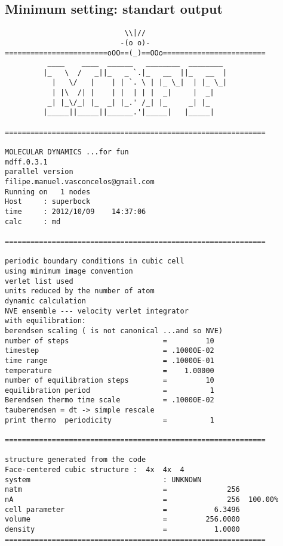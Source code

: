 \documentclass[a4paper]{article}
\begin{document}
\subsection{Minimum setting: standart output}
\begin{verbatim}
                            \\|//                    
                           -(o o)-                           
========================oOO==(_)==OOo========================
          ____    ____  ______   ________  ________  
         |_   \  /   _||_   _ `.|_   __  ||_   __  | 
           |   \/   |    | | `. \ | |_ \_|  | |_ \_| 
           | |\  /| |    | |  | | |  _|     |  _|    
          _| |_\/_| |_  _| |_.' /_| |_     _| |_     
         |_____||_____||______.'|_____|   |_____|    
  
=============================================================

MOLECULAR DYNAMICS ...for fun                 
mdff.0.3.1
parallel version
filipe.manuel.vasconcelos@gmail.com  
Running on   1 nodes                  
Host     : superbock
time     : 2012/10/09    14:37:06
calc     : md                                                          

=============================================================

periodic boundary conditions in cubic cell     
using minimum image convention                 
verlet list used 
units reduced by the number of atom
dynamic calculation
NVE ensemble --- velocity verlet integrator    
with equilibration:             
berendsen scaling ( is not canonical ...and so NVE)
number of steps                      =         10
timestep                             = .10000E-02
time range                           = .10000E-01
temperature                          =    1.00000
number of equilibration steps        =         10
equilibration period                 =          1
Berendsen thermo time scale          = .10000E-02
tauberendsen = dt -> simple rescale
print thermo  periodicity            =          1

=============================================================

structure generated from the code
Face-centered cubic structure :  4x  4x  4  
system                               : UNKNOWN                                                     
natm                                 =              256
nA                                   =              256  100.00%
cell parameter                       =           6.3496
volume                               =         256.0000
density                              =           1.0000
=============================================================


\end{verbatim}
\end{document}
